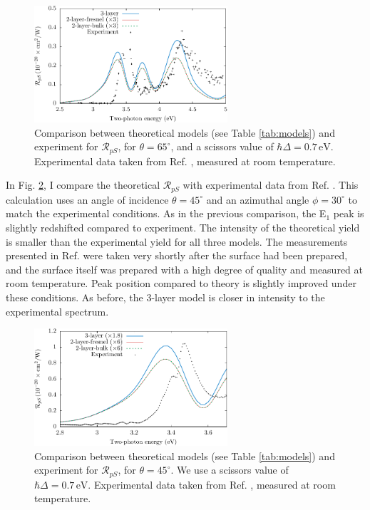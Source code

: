 \begin{figure}[b]
\centering
\includegraphics[width=0.64\textwidth]{content/figures/fig-Si1x1-Mejia_RpS}
\caption[$\mathcal{R}_{pS}$ compared to experimental data from Mejia et al.]
{Comparison between theoretical models (see Table \ref{tab:models}) and
experiment for $\mathcal{R}_{pS}$, for $\theta=65^{\circ}$, and a scissors value
of $\hbar\Delta = 0.7\,\text{eV}$. Experimental data taken from Ref.
\cite{mejiaPRB02}, measured at room temperature.}
\label{fig:RpS}
\end{figure}

In Fig. \ref{fig:mitchellRpS}, I compare the theoretical $\mathcal{R}_{pS}$ with
experimental data from Ref. \cite{mitchellSS01}. This calculation uses an angle
of incidence $\theta=45^\circ$ and an azimuthal angle $\phi=30^\circ$ to match
the experimental conditions. As in the previous comparison, the E$_{1}$ peak is
slightly redshifted compared to experiment. The intensity of the theoretical
yield is smaller than the experimental yield for all three models. The
measurements presented in Ref. \cite{mitchellSS01} were taken very shortly after
the surface had been prepared, and the surface itself was prepared with a high
degree of quality and measured at room temperature. Peak position compared to
theory is slightly improved under these conditions. As before, the 3-layer model
is closer in intensity to the experimental spectrum.

\begin{figure}[b]
\centering
\includegraphics[width=0.64\textwidth]{content/figures/fig-Si1x1-Mitchell_RpS}
\caption[$\mathcal{R}_{pS}$ compared to experimental data from Mitchell et al.]
{Comparison between theoretical models (see Table \ref{tab:models}) and
experiment for $\mathcal{R}_{pS}$, for $\theta=45^\circ$. We use a scissors
value of $\hbar\Delta = 0.7\,\text{eV}$. Experimental data taken from Ref.
\cite{mitchellSS01}, measured at room temperature.}
\label{fig:mitchellRpS}
\end{figure}

